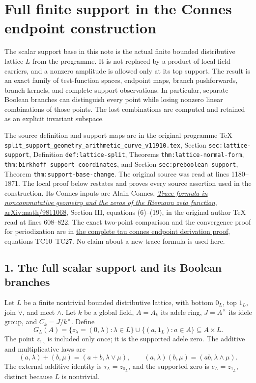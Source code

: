 \documentclass[
  10pt,
]{article}
\author{}
\date{}
\begin{document}
\section{Full finite support in the Connes endpoint
construction}\label{full-finite-support-in-the-connes-endpoint-construction}

The scalar support base in this note is the actual finite bounded
distributive lattice \(L\) from the programme. It is not replaced by a
product of local field carriers, and a nonzero amplitude is allowed only
at its top support. The result is an exact family of test-function
spaces, endpoint maps, branch pushforwards, branch kernels, and complete
support observations. In particular, separate Boolean branches can
distinguish every point while losing nonzero linear combinations of
those points. The lost combinations are computed and retained as an
explicit invariant subspace.

The source definition and support maps are in the original programme TeX
\texttt{split\_support\_geometry\_arithmetic\_curve\_v11910.tex},
Section \texttt{sec:lattice-support}, Definition
\texttt{def:lattice-split}, Theorems \texttt{thm:lattice-normal-form},
\texttt{thm:birkhoff-support-coordinates}, and Section
\texttt{sec:preboolean-support}, Theorem
\texttt{thm:support-base-change}. The original source was read at lines
1180--1871. The local proof below restates and proves every source
assertion used in the construction. Its Connes inputs are Alain Connes,
\href{https://arxiv.org/abs/math/9811068}{\emph{Trace formula in
noncommutative geometry and the zeros of the Riemann zeta function},
arXiv:math/9811068}, Section III, equations (6)--(19), in the original
author TeX read at lines 608--822. The exact two-point comparison and
the convergence proof for periodization are in
\href{TAU_CONNES_ENDPOINT_DERIVATION.md}{the complete tau connes
endpoint derivation proof}, equations TC10--TC27. No claim about a new
trace formula is used here.

\subsection{1. The full scalar support and its Boolean
branches}\label{the-full-scalar-support-and-its-boolean-branches}

Let \(L\) be a finite nontrivial bounded distributive lattice, with
bottom \(0_L\), top \(1_L\), join \(\vee\), and meet \(\wedge\). Let
\(k\) be a global field, \(A=A_k\) its adele ring, \(J=A^\times\) its
idele group, and \(C_k=J/k^\times\). Define \[
G_L(A)=\{z_\lambda=(0,\lambda):\lambda\in L\}
\cup\{(a,1_L):a\in A\}\subseteq A\times L.
\tag{FL1}
\] The point \(z_{1_L}\) is included only once; it is the supported
adele zero. The additive and multiplicative laws are \[
(a,\lambda)+(b,\mu)=(a+b,\lambda\vee\mu),\qquad
(a,\lambda)(b,\mu)=(ab,\lambda\wedge\mu).
\tag{FL2}
\] The external additive identity is \(\tau_L=z_{0_L}\), and the
supported zero is \(e_L=z_{1_L}\), distinct because \(L\) is nontrivial.
\end{document}

